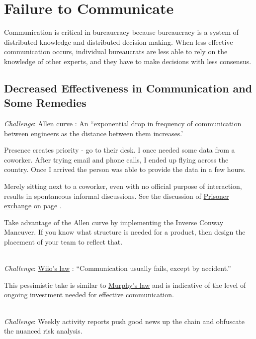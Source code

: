 \section{Failure to Communicate\label{sec:failure-to-comm}}

Communication is critical in bureaucracy because bureaucracy is a system of distributed knowledge and distributed decision making. When less effective communication occurs, individual bureaucrats are less able to rely on the knowledge of other experts, and they have to make decisions with less consensus. 

\subsection*{Decreased Effectiveness in Communication and Some Remedies}

\textit{Challenge}:  \href{https://en.wikipedia.org/wiki/Allen_curve}{Allen curve}
: 
An ``exponential drop in frequency of communication between engineers as the distance between them increases.'

Presence creates priority - go to their desk. I once needed some data from a coworker. After trying email and phone calls, I ended up flying across the country. Once I arrived the person was able to provide the data in a few hours.

Merely sitting next to a coworker, even with no official purpose of interaction, results in spontaneous informal discussions. See the discussion of \hyperref[sec:prisoner-exchange]{Prisoner exchange} on page \pageref{sec:prisoner-exchange}.

Take advantage of the Allen curve by implementing the Inverse Conway Maneuver. If you know what structure is needed for a product, then design the placement of your team to reflect that.

\ \\
\textit{Challenge}: \href{https://en.wikipedia.org/wiki/Wiio\%27s_laws}{Wiio's law}
: 
``Communication usually fails, except by accident.''

This pessimistic take is similar to \href{https://en.wikipedia.org/wiki/Murphy\%27s_law}{Murphy's law} and is indicative of the level of ongoing investment needed for effective communication. 

\ \\
\textit{Challenge}: Weekly activity reports push good news up the chain and obfuscate the nuanced risk analysis. 

